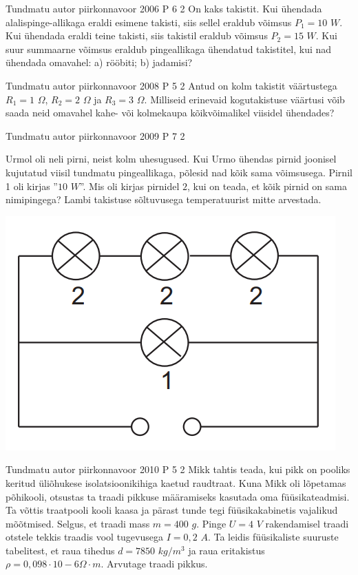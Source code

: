 \documentclass[11pt]{article}
\begin{document}
{%
{Tundmatu autor} %
{piirkonnavoor} %
{2006} %
{P 6} %
{2} %
{
\ifStatement
On kaks takistit. Kui ühendada alalispinge-allikaga eraldi esimene takisti, siis sellel eraldub võimsus $P_1 = 10$ $W$. Kui ühendada eraldi teine takisti, siis takistil eraldub võimsus $P_2 = 15$ $W$. Kui suur summaarne võimsus eraldub pingeallikaga ühendatud takistitel, kui nad ühendada omavahel: a) rööbiti; b) jadamisi?
\fi
}

{Tundmatu autor} %
{piirkonnavoor} %
{2008} %
{P 5} %
{2} %
{
\ifStatement
Antud on kolm takistit väärtustega $R_1 = 1$ $\Omega$, $R_2 = 2$ $\Omega$ ja $R_3 = 3$ $\Omega$. Milliseid erinevaid kogutakistuse väärtusi võib saada neid omavahel kahe- või kolmekaupa kõikvõimalikel viisidel ühendades?
\fi
}

{Tundmatu autor} %
{piirkonnavoor} %
{2009} %
{P 7} %
{2} %
{
\ifStatement
Urmol oli neli pirni, neist kolm uhesugused. Kui Urmo ühendas pirnid joonisel kujutatud viisil tundmatu pingeallikaga, põlesid nad kõik sama võimsusega. Pirnil 1 oli kirjas ”$10$ $W$”. Mis oli kirjas pirnidel $2$, kui on teada, et kõik pirnid on sama nimipingega? Lambi takistuse sõltuvusega temperatuurist mitte arvestada.
\begin{center}
	\includegraphics[width=0.5\linewidth]{2009-v2p-07-yl.png}
\end{center}
\fi
}

{Tundmatu autor} %
{piirkonnavoor} %
{2010} %
{P 5} %
{2} %
{
\ifStatement
Mikk tahtis teada, kui pikk on pooliks keritud üliõhukese isolatsioonikihiga kaetud raudtraat. Kuna Mikk oli lõpetamas põhikooli, otsustas ta traadi pikkuse määramiseks kasutada oma füüsikateadmisi. Ta võttis traatpooli kooli kaasa ja pärast tunde tegi füüsikakabinetis vajalikud mõõtmised. Selgus, et traadi mass $m = 400$ $g$. Pinge $U = 4$ $V$ rakendamisel traadi otstele tekkis traadis vool tugevusega $I = 0,2$ $A$. Ta leidis füüsikaliste suuruste tabelitest, et raua tihedus $d = 7850$ $kg/m^3$ ja raua eritakistus $\rho = 0,098 \cdot 10 - 6 \Omega \cdot m$. Arvutage traadi pikkus.
\fi
}

}
\end{document}
